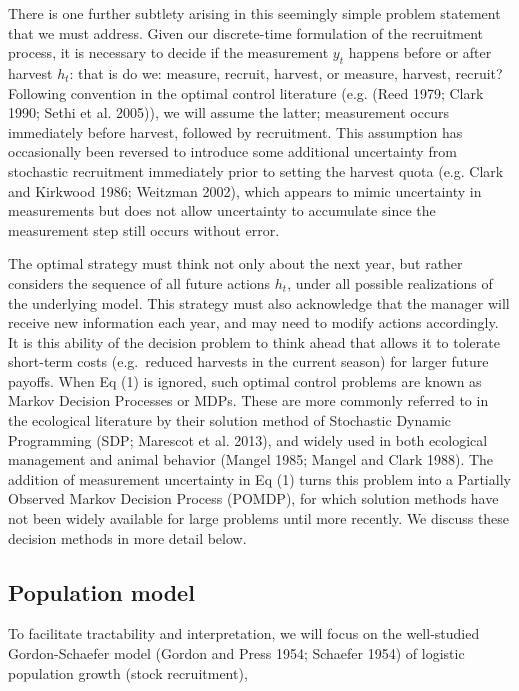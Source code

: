 \documentclass[3p]{elsarticle} %
\begin{document}
There is one further subtlety arising in this seemingly simple problem
statement that we must address. Given our discrete-time formulation of
the recruitment process, it is necessary to decide if the measurement
\(y_t\) happens before or after harvest \(h_t\): that is do we: measure,
recruit, harvest, or measure, harvest, recruit? Following convention in
the optimal control literature (e.g. (Reed 1979; Clark 1990; Sethi et
al. 2005)), we will assume the latter; measurement occurs immediately
before harvest, followed by recruitment. This assumption has
occasionally been reversed to introduce some additional uncertainty from
stochastic recruitment immediately prior to setting the harvest quota
(e.g. Clark and Kirkwood 1986; Weitzman 2002), which appears to mimic
uncertainty in measurements but does not allow uncertainty to accumulate
since the measurement step still occurs without error.

The optimal strategy must think not only about the next year, but rather
considers the sequence of all future actions \({h_t}\), under all
possible realizations of the underlying model. This strategy must also
acknowledge that the manager will receive new information each year, and
may need to modify actions accordingly. It is this ability of the
decision problem to think ahead that allows it to tolerate short-term
costs (e.g.~reduced harvests in the current season) for larger future
payoffs. When Eq (1) is ignored, such optimal control problems are known
as Markov Decision Processes or MDPs. These are more commonly referred
to in the ecological literature by their solution method of Stochastic
Dynamic Programming (SDP; Marescot et al. 2013), and widely used in both
ecological management and animal behavior (Mangel 1985; Mangel and Clark
1988). The addition of measurement uncertainty in Eq (1) turns this
problem into a Partially Observed Markov Decision Process (POMDP), for
which solution methods have not been widely available for large problems
until more recently. We discuss these decision methods in more detail
below.

\hypertarget{population-model}{%
\subsection{Population model}\label{population-model}}

To facilitate tractability and interpretation, we will focus on the
well-studied Gordon-Schaefer model (Gordon and Press 1954; Schaefer
1954) of logistic population growth (stock recruitment),
\end{document}
